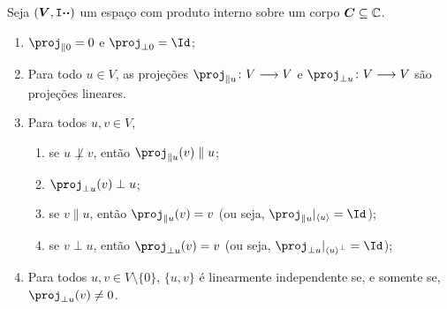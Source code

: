 \begin{prop}
Seja $(\bm V,\mathtt I{\bm{\cdot}}{\bm{\cdot}})$ um espaço com produto interno sobre um corpo $\bm C \subseteq \mathbb{C}$.
	\begin{enumerate}
	\item $\proj_{\parallel 0} = 0$ e $\proj_{\perp 0} = \Id$;
	\item Para todo $u \in V$, as projeções $\proj_{\parallel u}\colon V \to V$ e $\proj_{\perp u}\colon V \to V$ são projeções lineares.
	\item Para todos $u, v \in V$,
		\begin{enumerate}
		\item se $u \not\perp v$, então $\proj_{\parallel u}(v) \parallel u$;
		\item $\proj_{\perp u}(v) \perp u$;
		\item se $v \parallel u$, então $\proj_{\parallel u}(v) = v$ (ou seja, $\proj_{\parallel u}|_{\ger{u}} = \Id$);
		\item se $v \perp u$, então $\proj_{\perp u}(v) = v$ (ou seja, $\proj_{\perp u}|_{\ger{u}^\perp} = \Id$);
		\end{enumerate}
	\item Para todos $u,v \in V \setminus \{0\}$, $\{u,v\}$ é linearmente independente se, e somente se, $\proj_{\perp u}(v) \neq 0$.
	\end{enumerate}
\end{prop}
